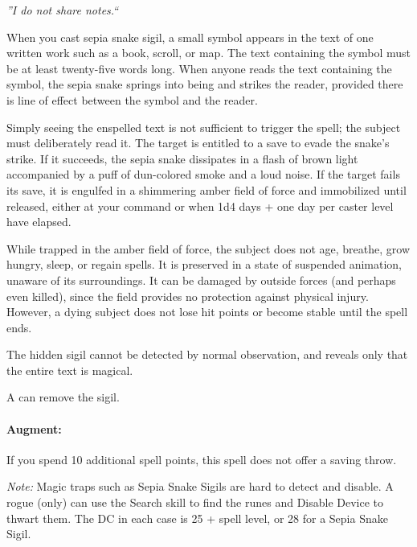 \emph{''I do not share notes.``}

When you cast sepia snake sigil, a small symbol appears in the text of one written work such as a book, scroll, or map. 
The text containing the symbol must be at least twenty-five words long. 
When anyone reads the text containing the symbol, the sepia snake springs into being and strikes the reader, 
provided there is line of effect between the symbol and the reader.

Simply seeing the enspelled text is not sufficient to trigger the spell; the subject must deliberately read it. 
The target is entitled to a save to evade the snake's strike. 
If it succeeds, the sepia snake dissipates in a flash of brown light accompanied by a puff of dun-colored smoke and a loud noise. 
If the target fails its save, it is engulfed in a shimmering amber field of force and immobilized until released, 
either at your command or when 1d4 days + one day per caster level have elapsed.

While trapped in the amber field of force, the subject does not age, breathe, grow hungry, sleep, or regain spells. 
It is preserved in a state of suspended animation, unaware of its surroundings. 
It can be damaged by outside forces (and perhaps even killed), since the field provides no protection against physical injury. 
However, a dying subject does not lose hit points or become stable until the spell ends.

The hidden sigil cannot be detected by normal observation, 
and  reveals only that the entire text is magical.

A  can remove the sigil. %

\paragraph{Augment:} If you spend 10 additional spell points, this spell does not offer a saving throw.

\emph{Note:} Magic traps such as Sepia Snake Sigils are hard to detect and disable. 
A rogue (only) can use the Search skill to find the runes and Disable Device to thwart them. 
The DC in each case is 25 + spell level, or 28 for a Sepia Snake Sigil.
